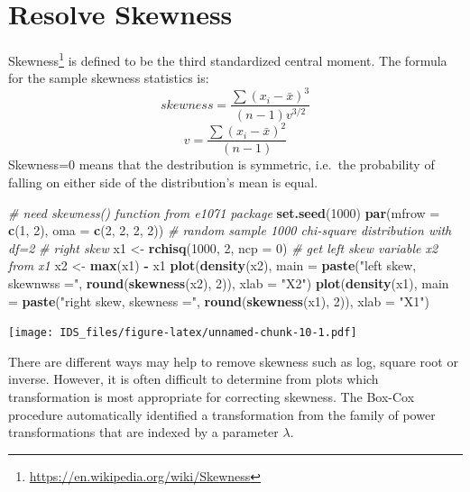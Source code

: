 \documentclass[12pt,]{krantz}
\makeatletter
\newenvironment{Shaded}{\begin{snugshade}}{\end{snugshade}}
\newcommand{\CommentTok}[1]{\textcolor[rgb]{0.37,0.37,0.37}{\textit{#1}}}
\newcommand{\DataTypeTok}[1]{\textcolor[rgb]{0.27,0.27,0.27}{#1}}
\newcommand{\DecValTok}[1]{\textcolor[rgb]{0.06,0.06,0.06}{#1}}
\newcommand{\KeywordTok}[1]{\textcolor[rgb]{0.27,0.27,0.27}{\textbf{#1}}}
\newcommand{\NormalTok}[1]{#1}
\newcommand{\OperatorTok}[1]{\textcolor[rgb]{0.43,0.43,0.43}{\textbf{#1}}}
\newcommand{\StringTok}[1]{\textcolor[rgb]{0.5,0.5,0.5}{#1}}
\renewcommand{\href}[2]{#2\footnote{\url{#1}}}
\newenvironment{kframe}{%
\medskip{}
\setlength{\fboxsep}{.8em}
 \def\at@end@of@kframe{}%
 \ifinner\ifhmode%
  \def\at@end@of@kframe{\end{minipage}}%
  \begin{minipage}{\columnwidth}%
 \fi\fi%
 \def\FrameCommand##1{\hskip\@totalleftmargin \hskip-\fboxsep
 \colorbox{shadecolor}{##1}\hskip-\fboxsep
     \hskip-\linewidth \hskip-\@totalleftmargin \hskip\columnwidth}%
 \MakeFramed {\advance\hsize-\width
   \@totalleftmargin\z@ \linewidth\hsize
   \@setminipage}}%
 {\par\unskip\endMakeFramed%
 \at@end@of@kframe}
\renewenvironment{Shaded}{\begin{kframe}}{\end{kframe}}
\makeatother
\begin{document}
\hypertarget{resolve-skewness}{%
\section{Resolve Skewness}\label{resolve-skewness}}

\href{https://en.wikipedia.org/wiki/Skewness}{Skewness} is defined to be the third standardized central moment. The formula for the sample skewness statistics is:
\[ skewness=\frac{\sum(x_{i}-\bar{x})^{3}}{(n-1)v^{3/2}}\]
\[v=\frac{\sum(x_{i}-\bar{x})^{2}}{(n-1)}\]
Skewness=0 means that the destribution is symmetric, i.e.~the probability of falling on either side of the distribution's mean is equal.

\begin{Shaded}
\begin{Highlighting}[]
\CommentTok{# need skewness() function from e1071 package}
\KeywordTok{set.seed}\NormalTok{(}\DecValTok{1000}\NormalTok{)}
\KeywordTok{par}\NormalTok{(}\DataTypeTok{mfrow =} \KeywordTok{c}\NormalTok{(}\DecValTok{1}\NormalTok{, }\DecValTok{2}\NormalTok{), }\DataTypeTok{oma =} \KeywordTok{c}\NormalTok{(}\DecValTok{2}\NormalTok{, }\DecValTok{2}\NormalTok{, }\DecValTok{2}\NormalTok{, }\DecValTok{2}\NormalTok{))}
\CommentTok{# random sample 1000 chi-square distribution with df=2}
\CommentTok{# right skew}
\NormalTok{x1 <-}\StringTok{ }\KeywordTok{rchisq}\NormalTok{(}\DecValTok{1000}\NormalTok{, }\DecValTok{2}\NormalTok{, }\DataTypeTok{ncp =} \DecValTok{0}\NormalTok{)}
\CommentTok{# get left skew variable x2 from x1}
\NormalTok{x2 <-}\StringTok{ }\KeywordTok{max}\NormalTok{(x1) }\OperatorTok{-}\StringTok{ }\NormalTok{x1}
\KeywordTok{plot}\NormalTok{(}\KeywordTok{density}\NormalTok{(x2), }\DataTypeTok{main =} \KeywordTok{paste}\NormalTok{(}\StringTok{"left skew, skewnwss ="}\NormalTok{, }
    \KeywordTok{round}\NormalTok{(}\KeywordTok{skewness}\NormalTok{(x2), }\DecValTok{2}\NormalTok{)), }\DataTypeTok{xlab =} \StringTok{"X2"}\NormalTok{)}
\KeywordTok{plot}\NormalTok{(}\KeywordTok{density}\NormalTok{(x1), }\DataTypeTok{main =} \KeywordTok{paste}\NormalTok{(}\StringTok{"right skew, skewness ="}\NormalTok{, }
    \KeywordTok{round}\NormalTok{(}\KeywordTok{skewness}\NormalTok{(x1), }\DecValTok{2}\NormalTok{)), }\DataTypeTok{xlab =} \StringTok{"X1"}\NormalTok{)}
\end{Highlighting}
\end{Shaded}

\texttt{[image: IDS\_files/figure-latex/unnamed-chunk-10-1.pdf]}

There are different ways may help to remove skewness such as log, square root or inverse. However, it is often difficult to determine from plots which transformation is most appropriate for correcting skewness. The Box-Cox procedure automatically identified a transformation from the family of power transformations that are indexed by a parameter \(\lambda\)\citep{BOXCOX1}.
\end{document}
